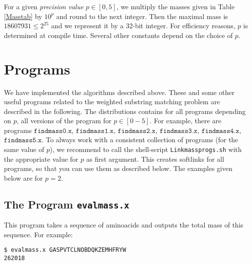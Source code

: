 \documentclass[12pt]{article}
\newcommand{\Showfile}[1]{{\small \texttt{#1}}}
\newcommand{\WSMP}{weighted substring matching problem\xspace}
\begin{document}
For a given \emph{precision value} \(p\in[0,5]\), 
we multiply the masses given in Table \ref{Masstab} by 
\(10^{p}\) and round to the next integer. Then the maximal mass is
$18607931\leq 2^{25}$ and we represent it by a 32-bit integer. For 
efficiency reasons, \(p\) is determined at compile time. Several other 
constants depend on the choice of \(p\). 
\begin{comment}
Hence we have implemented a 
program \Showfile{mkmasstab.x} which outputs appropriate C-definitions,
see Appendix \ref{Mkmasout} for an example. 
Besides the table storing the rounded masses, \Showfile{mkmasstab.x}
outputs constant definitions for the maximal and minimal masses
\(600\cdot 10^{p}\) and \(4000\cdot 10^{p}\). The output of 
\Showfile{mkmasstab.x} is stored in a header file 
\Showfile{masstab.h}, which is used by all programs described below.
\end{comment}


\section{Programs}
We have implemented the algorithms described above. These and some
other useful programs related to the \WSMP are described in the following. 
The distributions contains for all programs depending on \(p\),
all versions of the program for \(p\in[0-5]\). For example,
there are programs 
\(\texttt{findmass0.x}\),
\(\texttt{findmass1.x}\),
\(\texttt{findmass2.x}\),
\(\texttt{findmass3.x}\),
\(\texttt{findmass4.x}\),
\(\texttt{findmass5.x}\). To always work with a consistent 
collection of programs (for the same value of \(p\)), we recommend
to call the shell-script \texttt{Linkmassprogs.sh} with the appropriate
value for \(p\) as first argument. This creates softlinks 
for all programs, so that you can use them as described below.
The examples given below are for \(p=2\).

\subsection{The Program \texttt{evalmass.x}}
This program takes a sequence of aminoacids and outputs the total mass
of this sequence.  For example:

\begin{verbatim}
$ evalmass.x GASPVTCLNOBDQKZEMHFRYW
262018
\end{verbatim}
\end{document}
